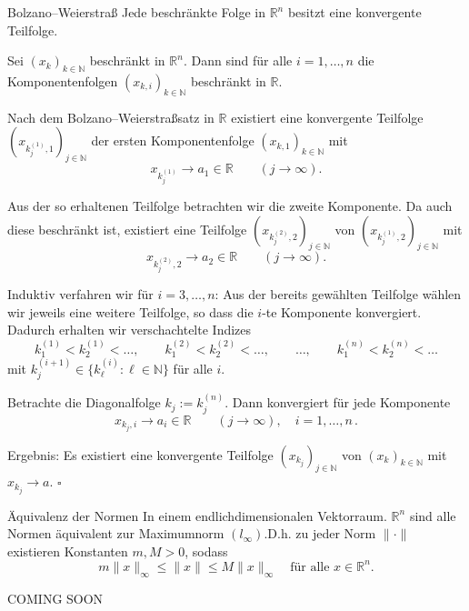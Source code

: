 \begin{satz}{Bolzano--Weierstraß}
    Jede beschränkte Folge in $\mathbb{R}^n$ besitzt eine konvergente Teilfolge.
\end{satz}

\begin{beweisbox}
    Sei $(x_k)_{k\in\mathbb{N}}$ beschränkt in $\mathbb{R}^n$.
    Dann sind für alle $i=1,\dots,n$ die Komponentenfolgen $(x_{k,i})_{k\in\mathbb{N}}$ beschränkt in $\mathbb{R}$.

    Nach dem Bolzano--Weierstraßsatz in $\mathbb{R}$ existiert eine konvergente Teilfolge
    $(x_{k_j^{(1)},1})_{j\in\mathbb{N}}$ der ersten Komponentenfolge $(x_{k,1})_{k\in\mathbb{N}}$
    mit
    $$
    x_{k_j^{(1)}}\longrightarrow a_1\in\mathbb{R}\qquad (j\to\infty).
    $$

    Aus der so erhaltenen Teilfolge betrachten wir die zweite Komponente.
    Da auch diese beschränkt ist, existiert eine Teilfolge
    $(x_{k_j^{(2)},2})_{j\in\mathbb{N}}$ von $(x_{k_j^{(1)},2})_{j\in\mathbb{N}}$
    mit
    $$
    x_{k_j^{(2)},2}\longrightarrow a_2\in\mathbb{R}\qquad (j\to\infty).
    $$

    Induktiv verfahren wir für $i=3,\dots,n$: Aus der bereits gewählten Teilfolge
    wählen wir jeweils eine weitere Teilfolge, so dass die $i$-te Komponente konvergiert.
    Dadurch erhalten wir verschachtelte Indizes
    $$
    k_1^{(1)}<k_2^{(1)}<\dots,\qquad
    k_1^{(2)}<k_2^{(2)}<\dots,\qquad\ldots,\qquad
    k_1^{(n)}<k_2^{(n)}<\dots
    $$
    mit $k_j^{(i+1)}\in\{k_\ell^{(i)}:\ell\in\mathbb{N}\}$ für alle $i$.

    Betrachte die Diagonalfolge $k_j:=k_j^{(n)}$. Dann konvergiert für jede Komponente
    $$
    x_{k_j,i}\longrightarrow a_i\in\mathbb{R}\qquad (j\to\infty),\quad i=1,\dots,n \, .
    $$

    Ergebnis: Es existiert eine konvergente Teilfolge $(x_{k_j})_{j\in\mathbb{N}}$ von
    $(x_k)_{k\in\mathbb{N}}$ mit $x_{k_j}\to a$. $\square$
\end{beweisbox}

\begin{satz}{Äquivalenz der Normen}
    In einem endlichdimensionalen Vektorraum. $\mathbb{R}^n$ sind alle Normen äquivalent zur Maximumnorm $(l_\infty)$.D.h. zu jeder Norm $\|\cdot\|$ existieren Konstanten $m,M>0$, sodass
    $$
        m\|x\|_\infty \le \|x\| \le M\|x\|_\infty \quad \text{für alle } x \in \mathbb{R}^n.
    $$
\end{satz}

\begin{beweisbox}
COMING SOON
\end{beweisbox}

